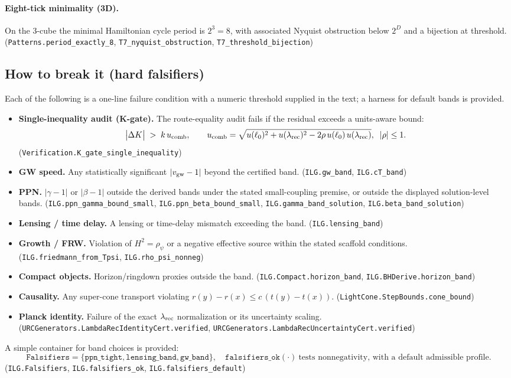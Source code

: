 \documentclass[12pt,a4paper]{article}
\begin{document}
\paragraph{Eight-tick minimality (3D).}
On the 3-cube the minimal Hamiltonian cycle period is \(2^3=8\), with associated Nyquist obstruction below \(2^D\) and a bijection at threshold.
\hfill(\texttt{Patterns.period\_exactly\_8}, \texttt{T7\_nyquist\_obstruction}, \texttt{T7\_threshold\_bijection})

\subsection{How to break it (hard falsifiers)}
Each of the following is a one-line failure condition with a numeric threshold supplied in the text; a harness for default bands is provided. 
\begin{itemize}
  \item \textbf{Single-inequality audit (K-gate).} The route-equality audit fails if the residual exceeds a units-aware bound:
  \[
  \bigl|\Delta K\bigr| \;>\; k\,u_{\rm comb},\qquad
  u_{\rm comb}=\sqrt{u(\ell_0)^2+u(\lambda_{\rm rec})^2-2\rho\,u(\ell_0)\,u(\lambda_{\rm rec})},\;\;|\rho|\le 1.
  \]
  \hfill(\texttt{Verification.K\_gate\_single\_inequality})
  \item \textbf{GW speed.} Any statistically significant \( |v_{\rm gw}-1| \) beyond the certified band. \hfill(\texttt{ILG.gw\_band}, \texttt{ILG.cT\_band})
  \item \textbf{PPN.} \( |\gamma-1| \) or \( |\beta-1| \) outside the derived bands under the stated small-coupling premise, or outside the displayed solution-level bands. \hfill(\texttt{ILG.ppn\_gamma\_bound\_small}, \texttt{ILG.ppn\_beta\_bound\_small}, \texttt{ILG.gamma\_band\_solution}, \texttt{ILG.beta\_band\_solution})
  \item \textbf{Lensing / time delay.} A lensing or time-delay mismatch exceeding the band. \hfill(\texttt{ILG.lensing\_band})
  \item \textbf{Growth / FRW.} Violation of \(H^2=\rho_\psi\) or a negative effective source within the stated scaffold conditions. \hfill(\texttt{ILG.friedmann\_from\_Tpsi}, \texttt{ILG.rho\_psi\_nonneg})
  \item \textbf{Compact objects.} Horizon/ringdown proxies outside the band. \hfill(\texttt{ILG.Compact.horizon\_band}, \texttt{ILG.BHDerive.horizon\_band})
  \item \textbf{Causality.} Any super-cone transport violating \(r(y)-r(x)\le c\,(t(y)-t(x))\). \hfill(\texttt{LightCone.StepBounds.cone\_bound})
  \item \textbf{Planck identity.} Failure of the exact \(\lambda_{\rm rec}\) normalization or its uncertainty scaling. \hfill(\texttt{URCGenerators.LambdaRecIdentityCert.verified}, \texttt{URCGenerators.LambdaRecUncertaintyCert.verified})
\end{itemize}
A simple container for band choices is provided:
\[
\texttt{Falsifiers}=\{\texttt{ppn\_tight},\texttt{lensing\_band},\texttt{gw\_band}\},\quad
\texttt{falsifiers\_ok}(\cdot)\ \text{tests nonnegativity, with a default admissible profile.}
\]
\hfill(\texttt{ILG.Falsifiers}, \texttt{ILG.falsifiers\_ok}, \texttt{ILG.falsifiers\_default})
\end{document}
